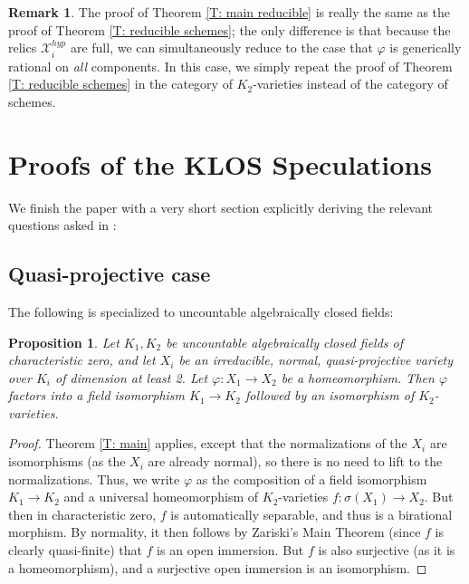 \documentclass{amsart}
\newtheorem{proposition}[theorem]{Proposition}
\theoremstyle{definition}
\newtheorem{remark}[theorem]{Remark}
\begin{document}
    \begin{remark} The proof of Theorem \ref{T: main reducible} is really the same as the proof of Theorem \ref{T: reducible schemes}; the only difference is that because the relics $\mathcal X_i^{hyp}$ are full, we can simultaneously reduce to the case that $\varphi$ is generically rational on \textit{all} components. In this case, we simply repeat the proof of Theorem \ref{T: reducible schemes} in the category of $K_2$-varieties instead of the category of schemes.
    \end{remark}

    \section{Proofs of the KLOS Speculations}

    We finish the paper with a very short section explicitly deriving the relevant questions asked in \cite{KLOS}:

    \subsection{Quasi-projective case}

    The following is \cite[Speculation 2.2.14]{KLOS} specialized to uncountable algebraically closed fields:

    \begin{proposition}\label{P: qp spec}
        Let $K_1,K_2$ be uncountable algebraically closed fields of characteristic zero, and let $X_i$ be an irreducible, normal, quasi-projective variety over $K_i$ of dimension at least 2. Let $\varphi:X_1\rightarrow X_2$ be a homeomorphism. Then $\varphi$ factors into a field isomorphism $K_1\rightarrow K_2$ followed by an isomorphism of $K_2$-varieties. 
    \end{proposition}
    \begin{proof}
        Theorem \ref{T: main} applies, except that the normalizations of the $X_i$ are isomorphisms (as the $X_i$ are already normal), so there is no need to lift to the normalizations. Thus, we write $\varphi$ as the composition of a field isomorphism $K_1\rightarrow K_2$ and a universal homeomorphism of $K_2$-varieties $f:\sigma(X_1)\rightarrow X_2$. But then in characteristic zero, $f$ is automatically separable, and thus is a birational morphism. By normality, it then follows by Zariski's Main Theorem (since $f$ is clearly quasi-finite) that $f$ is an open immersion. But $f$ is also surjective (as it is a homeomorphism), and a surjective open immersion is an isomorphism.  
    \end{proof}
\end{document}
